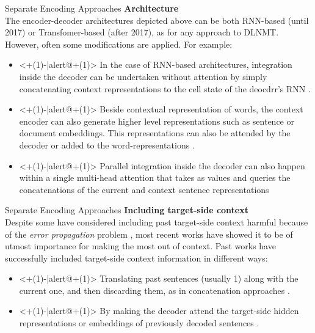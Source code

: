 \begin{frame}{Separate Encoding Approaches}
	\textbf{Architecture}\\
	The encoder-decoder architectures depicted above can be both RNN-based (until 2017) or Transfomer-based (after 2017), as for any approach to DLNMT. However, often some modifications are applied. For example:
	\begin{itemize} 
		\item<+(1)-|alert@+(1)> In the case of RNN-based architectures, integration inside the decoder can be undertaken without attention by simply concatenating context representations to the cell state of the deocdrr's RNN \cite{wang_exploiting_2017}.
		\item<+(1)-|alert@+(1)>  Beside contextual representation of words, the context encoder can also generate higher level representations such as sentence or document embeddings. This representations can also be attended by the decoder \cite{miculicich_document-level_2018, maruf_selective_2019} or added to the word-representations \cite{tan_hierarchical_2019}.
		\item<+(1)-|alert@+(1)> Parallel integration inside the decoder can also happen within a single multi-head attention that takes as values and queries the concatenations of the current and context sentence representations \cite{voita_when_2019}
	\end{itemize}
\end{frame}

\begin{frame}{Separate Encoding Approaches}
	\textbf{Including target-side context}\\
	Despite some have considered including past target-side context harmful because of the \textit{error propagation} problem \cite{zhang_improving_2018}, most recent works have showed it to be of utmost importance for making the most out of context. Past works have successfully included target-side context information in different ways:
	\begin{itemize}
		\item<+(1)-|alert@+(1)> Translating past sentences (usually 1) along with the current one, and then discarding them, as in concatenation approaches \cite{bawden_evaluating_2018}.
		\item<+(1)-|alert@+(1)> By making the decoder attend the target-side hidden representations or embeddings of previously decoded sentences \cite{miculicich_document-level_2018,voita_when_2019,maruf_selective_2019,zheng_toward_2020}.
	\end{itemize}
\end{frame}

